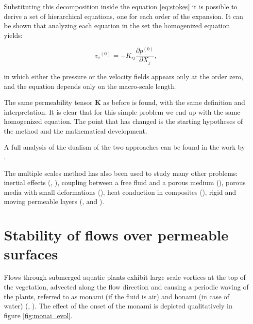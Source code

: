 Substituting this decomposition inside the equation \eqref{eq:stokes} it is possible to derive a set of hierarchical equations, one for each order of the expansion.
It can be shown that analyzing each equation in the set the homogenized equation yields:

\begin{equation}
{v_i}^{(0)} = -K_{ij} \dfrac{\partial p^{(0)}}{\partial X_j},
\label{eq:darcy_ms}
\end{equation} 

\noindent in which either the pressure or the velocity fields appears only at the order zero, and the equation depends only on the macro-scale length.

The same permeability tensor $\mathbf{K}$ as before is found, with the same definition and interpretation.
It is clear that for this simple problem we end up with the same homogenized equation. The point that has changed is the starting hypotheses of the method and the mathematical development.

A full analysis of the dualism of the two approaches can be found in the work by \citet{davit2013homogenization}.

The multiple scales method has also been used to study many other problems: inertial effects (\citet{mei1991effect}, \citet{skjetne1999new}), coupling between a free fluid and a porous medium (\citet{mikelic2000interface}), porous media with small deformations (\citet{auriault1977etude}), heat conduction in composites (\citet{auriault1983effective}), rigid and moving permeable layers (\citet{zampogna2016fluid}, \citet{ugis} and \citet{zampogna2017pelskin}).



\section{Stability of flows over permeable surfaces}
\label{sec:stability}

Flows through submerged aquatic plants exhibit large scale vortices at the top of the vegetation,
advected along the flow direction and causing a periodic waving of the plants, referred to as
monami (if the fluid is air) and honami (in case of water) (\citet{inoue1955studies}, \citet{ackerman1993reduced}).
The effect of the onset of the monami is depicted qualitatively in figure \ref{fig:monai_evol}.

